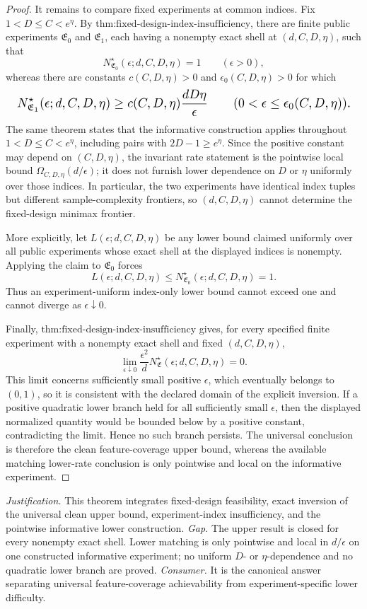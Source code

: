 \documentclass{article}
\begin{document}
\begin{proof}
It remains to compare fixed experiments at common indices. Fix \(1<D\le C<e^\eta\). By \(\text{thm:fixed-design-index-insufficiency}\), there are finite public experiments \(\mathfrak E_0\) and \(\mathfrak E_1\), each having a nonempty exact shell at \((d,C,D,\eta)\), such that
\[
N^\star_{\mathfrak E_0}(\epsilon;d,C,D,\eta)=1
\qquad(\epsilon>0),
\]
whereas there are constants \(c(C,D,\eta)>0\) and \(\epsilon_0(C,D,\eta)>0\) for which
\[
\makebox[\linewidth][c]{\resizebox{0.98\linewidth}{!}{\(\displaystyle N^\star_{\mathfrak E_1}(\epsilon;d,C,D,\eta)
\ge c(C,D,\eta)\frac{dD\eta}{\epsilon}
\qquad(0<\epsilon\le\epsilon_0(C,D,\eta)).\)}}
\]
The same theorem states that the informative construction applies throughout \(1<D\le C<e^\eta\), including pairs with \(2D-1\ge e^\eta\). Since the positive constant may depend on \((C,D,\eta)\), the invariant rate statement is the pointwise local bound \(\Omega_{C,D,\eta}(d/\epsilon)\); it does not furnish lower dependence on \(D\) or \(\eta\) uniformly over those indices. In particular, the two experiments have identical index tuples but different sample-complexity frontiers, so \((d,C,D,\eta)\) cannot determine the fixed-design minimax frontier.

More explicitly, let \(L(\epsilon;d,C,D,\eta)\) be any lower bound claimed uniformly over all public experiments whose exact shell at the displayed indices is nonempty. Applying the claim to \(\mathfrak E_0\) forces
\[
L(\epsilon;d,C,D,\eta)
\le N^\star_{\mathfrak E_0}(\epsilon;d,C,D,\eta)=1.
\]
Thus an experiment-uniform index-only lower bound cannot exceed one and cannot diverge as \(\epsilon\downarrow0\).

Finally, \(\text{thm:fixed-design-index-insufficiency}\) gives, for every specified finite experiment with a nonempty exact shell and fixed \((d,C,D,\eta)\),
\[
\lim_{\epsilon\downarrow0}
\frac{\epsilon^2}{d}N^\star_{\mathfrak E}(\epsilon;d,C,D,\eta)=0.
\]
This limit concerns sufficiently small positive \(\epsilon\), which eventually belongs to \((0,1)\), so it is consistent with the declared domain of the explicit inversion. If a positive quadratic lower branch held for all sufficiently small \(\epsilon\), then the displayed normalized quantity would be bounded below by a positive constant, contradicting the limit. Hence no such branch persists. The universal conclusion is therefore the clean feature-coverage upper bound, whereas the available matching lower-rate conclusion is only pointwise and local on the informative experiment.
\end{proof}
\par\smallskip\noindent \textit{Justification.} This theorem integrates fixed-design feasibility, exact inversion of the universal clean upper bound, experiment-index insufficiency, and the pointwise informative lower construction. \textit{Gap.} The upper result is closed for every nonempty exact shell. Lower matching is only pointwise and local in \(d/\epsilon\) on one constructed informative experiment; no uniform \(D\)- or \(\eta\)-dependence and no quadratic lower branch are proved. \textit{Consumer.} It is the canonical answer separating universal feature-coverage achievability from experiment-specific lower difficulty.
\end{document}
